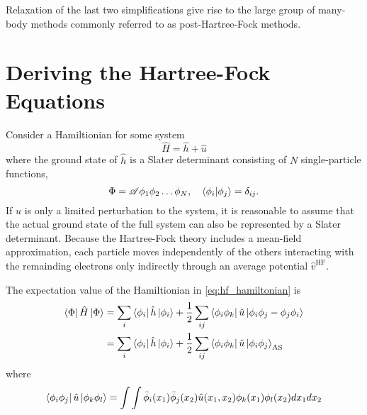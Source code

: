     Relaxation of the last two simplifications give rise to the large group of
    many-body methods commonly referred to as post-Hartree-Fock methods. 

    \section{Deriving the Hartree-Fock Equations}

    Consider a Hamiltionian for some system
    \begin{equation}
        \label{eq:hf_hamiltonian}
        \hat{H} = \hat{h} + \hat{u}
    \end{equation}
    where the ground state of $\hat{h}$ is a Slater determinant consisting 
    of $N$ single-particle functions,
    \begin{equation}
        \Phi = \mathscr{A}\phi_1 \phi_2 \dots \phi_N, \quad 
            \braket{\phi_i}{\phi_j} = \delta_{ij}.
    \end{equation} 
    If $\hat{u}$ is 
    only a limited perturbation to the system, it is reasonable to assume that the 
    actual ground state of the full system can also be represented by a Slater 
    determinant. Because the Hartree-Fock theory includes a mean-field approximation,
    each particle moves independently of the others interacting with the remainding
    electrons only indirectly through an average potential $\hat{v}^{\text{HF}}$.

    The expectation value of the Hamiltionian in \autoref{eq:hf_hamiltonian} is 
    \begin{equation}
        \label{eq:hf_energy}
        \begin{aligned}
         \bra{\Phi} \hat{H} \ket{\Phi} 
            &= \sum_i \bra{\phi_i} \hat{h} \ket{\phi_i}
            + \frac{1}{2} \sum_{ij} \bra{\phi_i \phi_k} \hat{u} 
                \ket{\phi_i \phi_j - \phi_j \phi_i} \\
            &= \sum_i \bra{\phi_i} \hat{h} \ket{\phi_i}
            + \frac{1}{2} \sum_{ij} \bra{\phi_i \phi_k} \hat{u} 
                \ket{\phi_i \phi_j}_\text{AS}
        \end{aligned}
    \end{equation}
    where 
    \begin{equation*}
        \bra{\phi_i \phi_j} \hat{u} \ket{\phi_k \phi_l}
         = \int \int \bar{\phi}_i(x_1) \bar{\phi}_j(x_2) 
            \hat{u}(x_1, x_2) \phi_k(x_1) \phi_l(x_2) dx_1 dx_2
    \end{equation*}

